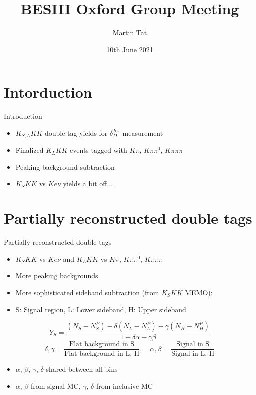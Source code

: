\documentclass{beamer}
\title[BESIII Oxford]{BESIII Oxford Group Meeting}
\author{Martin Tat}
\institute{Oxford LHCb}
\date{10th June 2021}
\begin{document}
\begin{frame}
  \titlepage
\end{frame}


\section{Intorduction}
\begin{frame}{Introduction}
  \begin{itemize}
    \setlength\itemsep{2em}
    \item{$K_{S, L}KK$ double tag yields for $\delta_D^{K\pi}$ measurement}
    \item{Finalized $K_LKK$ events tagged with $K\pi$, $K\pi\pi^0$, $K\pi\pi\pi$}
    \item{Peaking background subtraction}
    \item{$K_SKK$ vs $Ke\nu$ yields a bit off...}
  \end{itemize}
\end{frame}

\section{Partially reconstructed double tags}
\begin{frame}{Partially reconstructed double tags}
  \begin{itemize}
    \setlength\itemsep{1em}
    \item{$K_SKK$ vs $Ke\nu$ and $K_LKK$ vs $K\pi$, $K\pi\pi^0$, $K\pi\pi\pi$}
    \item{More peaking backgrounds}
    \item{More sophisticated sideband subtraction (from $K_SKK$ MEMO):}
    \item{S: Signal region, L: Lower sideband, H: Upper sideband}
  \end{itemize}
  \begin{equation*}
    Y_S = \frac{(N_S - N_S^P) - \delta(N_L - N_L^P) - \gamma(N_H - N_H^P)}{1 - \delta\alpha - \gamma\beta}
  \end{equation*}
  \begin{equation*}
    \delta, \gamma = \frac{\text{Flat background in S}}{\text{Flat background in L, H}}, \quad \alpha, \beta = \frac{\text{Signal in S}}{\text{Signal in L, H}}
  \end{equation*}
  \begin{itemize}
    \item{$\alpha$, $\beta$, $\gamma$, $\delta$ shared between all bins}
    \item{$\alpha$, $\beta$ from signal MC, $\gamma$, $\delta$ from inclusive MC}
  \end{itemize}
\end{frame}
\end{document}
